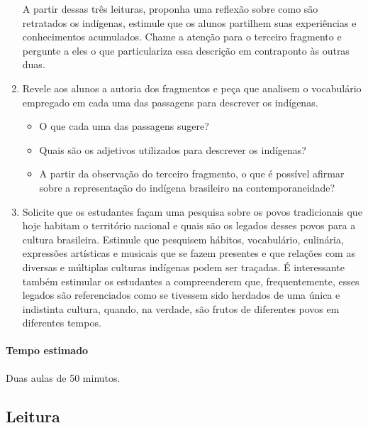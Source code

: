 \documentclass[12pt]{extarticle}
\begin{document}
\begin{enumerate}
A partir dessas três leituras, proponha uma reflexão sobre como são
retratados os indígenas, estimule que os alunos partilhem suas
experiências e conhecimentos acumulados. Chame a atenção para o
terceiro fragmento e pergunte a eles o que particulariza essa
descrição em contraponto às outras duas.

\item Revele aos alunos a autoria dos fragmentos e peça que analisem o
vocabulário empregado em cada uma das passagens para descrever os
indígenas.

\begin{itemize}
\item
  O que cada uma das passagens sugere?
\item
  Quais são os adjetivos utilizados para descrever os indígenas?
\item
  A partir da observação do terceiro fragmento, o que é possível afirmar
  sobre a representação do indígena brasileiro na contemporaneidade?
\end{itemize}

\item Solicite que os estudantes façam uma pesquisa sobre os povos
tradicionais que hoje habitam o território nacional e quais são os
legados desses povos para a cultura brasileira. Estimule que
pesquisem hábitos, vocabulário, culinária, expressões artísticas e
musicais que se fazem presentes e que relações com as diversas e
múltiplas culturas indígenas podem ser traçadas. É interessante
também estimular os estudantes a compreenderem que, frequentemente,
esses legados são referenciados como se tivessem sido herdados de
uma única e indistinta cultura, quando, na verdade, são frutos de
diferentes povos em diferentes tempos.
\end{enumerate}

\paragraph{Tempo estimado} Duas aulas de 50 minutos.

\subsection{Leitura}
\end{document}
